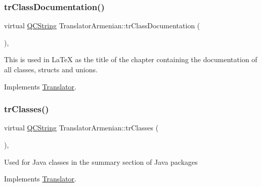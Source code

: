 \mbox{\label{class_translator_armenian_a85a7022ed8ab49077212199572d48c7c}} 
\subsubsection{\texorpdfstring{trClassDocumentation()}{trClassDocumentation()}}
{\footnotesize\ttfamily virtual \mbox{\hyperlink{class_q_c_string}{Q\+C\+String}} Translator\+Armenian\+::tr\+Class\+Documentation (\begin{DoxyParamCaption}{ }\end{DoxyParamCaption})\hspace{0.3cm}{\ttfamily [inline]}, {\ttfamily [virtual]}}

This is used in La\+TeX as the title of the chapter containing the documentation of all classes, structs and unions. 

Implements \mbox{\hyperlink{class_translator}{Translator}}.

\mbox{\label{class_translator_armenian_a25fcc2887de878dae748def84b542696}} 
\subsubsection{\texorpdfstring{trClasses()}{trClasses()}}
{\footnotesize\ttfamily virtual \mbox{\hyperlink{class_q_c_string}{Q\+C\+String}} Translator\+Armenian\+::tr\+Classes (\begin{DoxyParamCaption}{ }\end{DoxyParamCaption})\hspace{0.3cm}{\ttfamily [inline]}, {\ttfamily [virtual]}}

Used for Java classes in the summary section of Java packages 

Implements \mbox{\hyperlink{class_translator}{Translator}}.

\mbox{\label{class_translator_armenian_aad7436ad04d3ccf88781333656ae766b}} 
